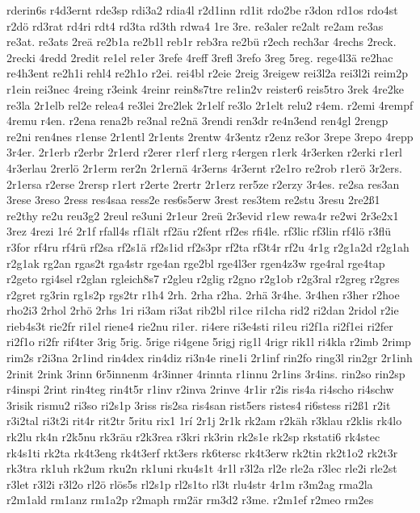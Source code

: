 {rderin6s
r4d3ernt
rde3sp
rdi3a2
rdia4l
r2d1inn
rd1it
rdo2be
r3don
rd1os
rdo4st
r2dö
rd3rat
rd4ri
rdt4
rd3ta
rd3th
rdwa4
1re
3re.
re3aler
re2alt
re2am
re3as
re3at.
re3ats
2reä
re2b1a
re2b1l
reb1r
reb3ra
re2bü
r2ech
rech3ar
4rechs
2reck.
2recki
4redd
2redit
re1el
re1er
3refe
4reff
3refl
3refo
3reg
5reg.
rege4l3ä
re2hac
re4h3ent
re2h1i
rehl4
re2h1o
r2ei.
rei4bl
r2eie
2reig
3reigew
rei3l2a
rei3l2i
reim2p
r1ein
rei3nec
4reing
r3eink
4reinr
rein8s7tre
re1in2v
reister6
reis5tro
3rek
4re2ke
re3la
2r1elb
rel2e
relea4
re3lei
2re2lek
2r1elf
re3lo
2r1elt
relu2
r4em.
r2emi
4rempf
4remu
r4en.
r2ena
rena2b
re3nal
re2nä
3rendi
ren3dr
re4n3end
ren4gl
2rengp
re2ni
ren4nes
r1ense
2r1entl
2r1ents
2rentw
4r3entz
r2enz
re3or
3repe
3repo
4repp
3r4er.
2r1erb
r2erbr
2r1erd
r2erer
r1erf
r1erg
r4ergen
r1erk
4r3erken
r2erki
r1erl
4r3erlau
2rerlö
2r1erm
rer2n
2r1ernä
4r3erns
4r3ernt
r2e1ro
re2rob
r1erö
3r2ers.
2r1ersa
r2erse
2rersp
r1ert
r2erte
2rertr
2r1erz
rer5ze
r2erzy
3r4es.
re2sa
res3an
3rese
3reso
2ress
res4saa
ress2e
res6s5erw
3rest
res3tem
re2stu
3resu
2re2ß1
re2thy
re2u
reu3g2
2reul
re3uni
2r1eur
2reü
2r3evid
r1ew
rewa4r
re2wi
2r3e2x1
3rez
4rezi
1ré
2r1f
rfall4s
rf1ält
rf2äu
r2fent
rf2es
rfi4le.
rf3lic
rf3lin
rf4lö
r3flü
r3for
rf4ru
rf4rü
rf2sa
rf2s1ä
rf2s1id
rf2s3pr
rf2ta
rf3t4r
rf2u
4r1g
r2g1a2d
r2g1ah
r2g1ak
rg2an
rgas2t
rga4str
rge4an
rge2bl
rge4l3er
rgen4z3w
rge4ral
rge4tap
r2geto
rgi4sel
r2glan
rgleich8s7
r2gleu
r2glig
r2gno
r2g1ob
r2g3ral
r2greg
r2gres
r2gret
rg3rin
rg1s2p
rgs2tr
r1h4
2rh.
2rha
r2ha.
2rhä
3r4he.
3r4hen
r3her
r2hoe
rho2i3
2rhol
2rhö
2rhs
1ri
ri3am
ri3at
rib2bl
ri1ce
ri1cha
rid2
ri2dan
2ridol
r2ie
rieb4s3t
rie2fr
ri1el
riene4
rie2nu
ri1er.
ri4ere
ri3e4sti
ri1eu
ri2f1a
ri2f1ei
ri2fer
ri2f1o
ri2fr
rif4ter
3rig
5rig.
5rige
ri4gene
5rigj
rig1l
4rigr
rik1l
ri4kla
r2imb
2rimp
rim2s
r2i3na
2r1ind
rin4dex
rin4diz
ri3n4e
rine1i
2r1inf
rin2fo
ring3l
rin2gr
2r1inh
2rinit
2rink
3rinn
6r5innenm
4r3inner
4rinnta
r1innu
2r1ins
3r4ins.
rin2so
rin2sp
r4inspi
2rint
rin4teg
rin4t5r
r1inv
r2inva
2rinve
4r1ir
r2is
ris4a
ri4scho
ri4schw
3risik
rismu2
ri3so
ri2s1p
3riss
ris2sa
ris4san
rist5ers
ristes4
ri6stess
ri2ß1
r2it
r3i2tal
ri3t2i
rit4r
rit2tr
5ritu
rix1
1rí
2r1j
2r1k
rk2am
r2käh
r3klau
r2klis
rk4lo
rk2lu
rk4n
r2k5nu
rk3räu
r2k3rea
r3kri
rk3rin
rk2s1e
rk2sp
rkstati6
rk4stec
rk4s1ti
rk2ta
rk4t3eng
rk4t3erf
rkt3ers
rk6tersc
rk4t3erw
rk2tin
rk2t1o2
rk2t3r
rk3tra
rk1uh
rk2um
rku2n
rk1uni
rku4s1t
4r1l
r3l2a
rl2e
rle2a
r3lec
rle2i
rle2st
r3let
r3l2i
r3l2o
rl2ö
rlös5s
rl2s1p
rl2s1to
rl3t
rlu4str
4r1m
r3m2ag
rma2la
r2m1ald
rm1anz
rm1a2p
r2maph
rm2är
rm3d2
r3me.
r2m1ef
r2meo
rm2es
}
